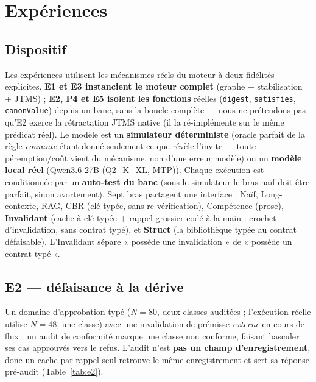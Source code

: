 \documentclass[11pt]{article}
\begin{document}
\section{Expériences}
\subsection{Dispositif}
Les expériences utilisent les mécanismes réels du moteur à deux fidélités explicites. \textbf{E1 et E3 instancient
le moteur complet} (graphe + stabilisation + JTMS) ; \textbf{E2, P4 et E5 isolent les fonctions} réelles
(\texttt{digest}, \texttt{satisfies}, \texttt{canonValue}) depuis un banc, sans la boucle complète --- nous ne
prétendons pas qu'E2 exerce la rétractation JTMS native (il la ré-implémente sur le même prédicat réel). Le modèle
est un \textbf{simulateur déterministe} (oracle parfait de la règle \emph{courante} étant donné seulement ce que
révèle l'invite --- toute péremption/coût vient du mécanisme, non d'une erreur modèle) ou un \textbf{modèle local
réel} (Qwen3.6-27B (Q2\_K\_XL, MTP)). Chaque exécution est conditionnée par un \textbf{auto-test du banc} (sous le
simulateur le bras naïf doit être parfait, sinon avortement). Sept bras partagent une interface : Naïf,
Long-contexte, RAG, CBR (clé typée, sans re-vérification), Compétence (prose), \textbf{Invalidant} (cache à clé
typée + rappel grossier codé à la main : crochet d'invalidation, sans contrat typé), et \textbf{Struct} (la
bibliothèque typée au contrat défaisable). L'Invalidant sépare « possède une invalidation » de « possède un contrat
typé ».

\subsection{E2 --- défaisance à la dérive}
Un domaine d'approbation typé ($N{=}80$, deux classes auditées ; l'exécution réelle utilise $N{=}48$, une classe)
avec une invalidation de prémisse \emph{externe} en cours de flux : un audit de conformité marque une classe non
conforme, faisant basculer ses cas approuvés vers le refus. L'audit n'est \textbf{pas un champ d'enregistrement},
donc un cache par rappel seul retrouve le même enregistrement et sert sa réponse pré-audit (Table~\ref{tab:e2}).
\end{document}
